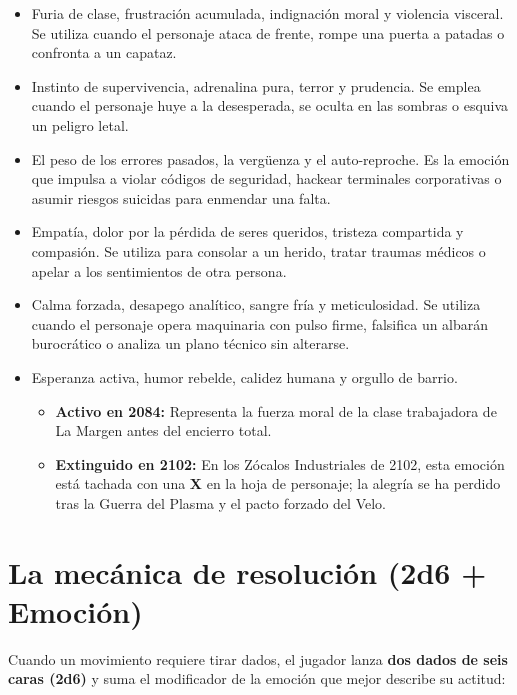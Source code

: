 \begin{itemize}
  \item {} Furia de clase, frustración acumulada, indignación moral y violencia visceral. Se utiliza cuando el personaje ataca de frente, rompe una puerta a patadas o confronta a un capataz.
  \item {} Instinto de supervivencia, adrenalina pura, terror y prudencia. Se emplea cuando el personaje huye a la desesperada, se oculta en las sombras o esquiva un peligro letal.
  \item {} El peso de los errores pasados, la vergüenza y el auto-reproche. Es la emoción que impulsa a violar códigos de seguridad, hackear terminales corporativas o asumir riesgos suicidas para enmendar una falta.
  \item {} Empatía, dolor por la pérdida de seres queridos, tristeza compartida y compasión. Se utiliza para consolar a un herido, tratar traumas médicos o apelar a los sentimientos de otra persona.
  \item {} Calma forzada, desapego analítico, sangre fría y meticulosidad. Se utiliza cuando el personaje opera maquinaria con pulso firme, falsifica un albarán burocrático o analiza un plano técnico sin alterarse.
  \item {} Esperanza activa, humor rebelde, calidez humana y orgullo de barrio.
    \begin{itemize}
      \item \textbf{Activo en 2084:} Representa la fuerza moral de la clase trabajadora de La Margen antes del encierro total.
      \item \textbf{Extinguido en 2102:} En los Zócalos Industriales de 2102, esta emoción está tachada con una \textbf{X} en la hoja de personaje; la alegría se ha perdido tras la Guerra del Plasma y el pacto forzado del Velo.
    \end{itemize}
\end{itemize}

\section{La mecánica de resolución (2d6 + Emoción)}

Cuando un movimiento requiere tirar dados, el jugador lanza \textbf{dos dados de seis caras (2d6)} y suma el modificador de la emoción que mejor describe su actitud:

